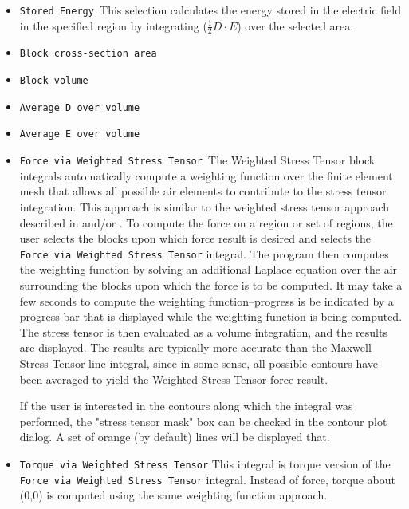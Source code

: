 \documentclass[12pt]{report}
\begin{document}
\begin{itemize}


\item \texttt{Stored Energy }This selection calculates the energy stored in the
electric field in the specified region by integrating ($\frac{1}{2}
D \cdot E$) over the selected area.

\item \texttt{Block cross-section area}

\item \texttt{Block volume}

\item \texttt{Average D over volume}

\item \texttt{Average E over volume}

\item \texttt{Force via Weighted Stress Tensor }The Weighted Stress Tensor block
integrals automatically compute a weighting function over the
finite element mesh that allows all possible air elements to
contribute to the stress tensor integration. This approach is
similar to the weighted stress tensor approach described in
\cite{mcfee} and/or \cite{henforce}. To compute the force on a region or
set of regions, the user selects the blocks upon which force result
is desired and selects the \texttt{Force via Weighted Stress
Tensor} integral. The program then computes the weighting function
by solving an additional Laplace equation over the air surrounding
the blocks upon which the force is to be computed. It may take a
few seconds to compute the weighting function--progress is be
indicated by a progress bar that is displayed while the weighting
function is being computed. The stress tensor is then evaluated as
a volume integration, and the results are displayed. The results
are typically more accurate than the Maxwell Stress Tensor line
integral, since in some sense, all possible contours have been
averaged to yield the Weighted Stress Tensor force result.


If the user is interested in the contours along which the integral was
performed, the "stress tensor mask" box can be checked in the contour plot
dialog. A set of orange (by default) lines will be displayed that.

\item \texttt{Torque via Weighted Stress Tensor} This integral is torque version
of the \texttt{Force via Weighted Stress Tensor} integral. Instead
of force, torque about (0,0) is computed using the same weighting
function approach.
\end{itemize}
\end{document}
